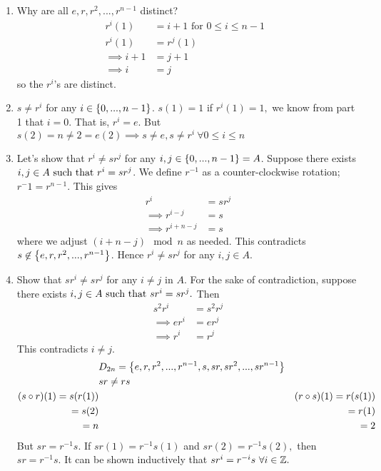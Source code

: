 \begin{enumerate}
    \item Why are all $e, r, r^2, ..., r^{n-1}$ distinct? 
    \begin{align*}
        r^i(1) &= i + 1 \text{ for $0\leq i \leq n -1$ } \\
        r^i(1) &= r^j(1) \\
        \implies i + 1 &= j + 1 \\
        \implies i &= j
    \end{align*}
    so the $r^i$'s are distinct.

    \item $s \not = r^i$ for any $i \in \left\{0, ..., n-1\right\}$. $s(1) = 1$ if $r^i(1) = 1,$ we know from part 1 that $i = 0$. That is, $r^i = e$. But $s(2) = n \not = 2 = e(2) \implies s \not = e, s \not = r^i ~\forall 0 \leq i \leq n$

    \item Let's show that $r^i \not = sr^j$ for any $i, j \in \left\{0, ..., n-1\right\} = A$.
    Suppose there exists $i,j\in A \text{ such that } r^i = sr^j$. We define $r^{-1}$ as a counter-clockwise rotation; $r^-1 = r^{n-1}$. This gives 
    \begin{align*}
        r^i &= sr^j \\
        \implies r^{i-j} &= s \\
        \implies r^{i + n-j} &= s
    \end{align*}
    where we adjust $(i + n-j) \mod n$ as needed. This contradicts $s \not \in \left\{e, r, r^2, ..., r^{n-1}\right\}$. Hence $r^i \not = sr^j$ for any $i, j \in A$.

    \item Show that $sr^i \not = sr^j$ for any $i \not = j$ in $A$.
    For the sake of contradiction, suppose there exists $i, j \in A \text{ such that } sr^i = sr^j.$ Then 
    \begin{align*}
        s^2r^i &= s^2r^j \\
        \implies er^i &= er^j \\
        \implies r^i &= r^j
    \end{align*}
    This contradicts $i \not = j$.
    \begin{align*}
        &D_{2n} = \left\{e, r, r^2, ..., r^{n-1}, s, sr, sr^2, ..., sr^{n-1}\right\} \\ 
        &sr \not = rs \\
        (s\circ r)(1)=s(r(1)) &&(r \circ s)(1)=r(s(1)) \\
        = s(2)  &&= r(1)  \\
        = n  &&= 2
    \end{align*}
    But $sr = r^{-1}s$. If $sr(1) = r^{-1}s(1)$ and $sr(2) = r^{-1}s(2),$ then $sr = r^{-1}s.$ It can be shown inductively that $sr^i = r^{-i}s ~\forall i \in \mathbb{Z}.$
\end{enumerate}

